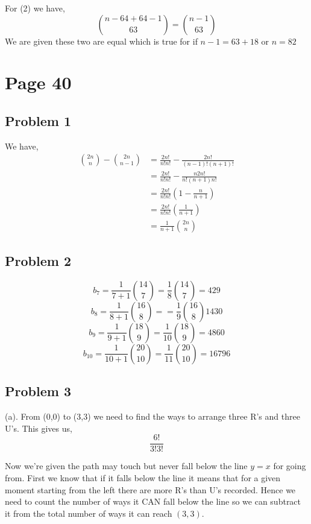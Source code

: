 \documentclass[a4paper]{report}
\begin{document}
For (2) we have, 
$$ {n - 64 + 64 - 1 \choose 63} = {n - 1 \choose 63} $$ 
We are given these two are equal which is true for if $n - 1 = 63 + 18$ or  $n = 82$


\section*{Page 40}
\subsection*{Problem 1}
We have, 
\begin{align*}
    {2n \choose n } - {2n \choose n - 1} &= \frac{2n!}{n!n!} - \frac{2n!}{(n-1)!(n + 1)!}\\
                                         &= \frac{2n!}{n!n!} - \frac{n 2n!}{n! (n+1) n!}\\
                                         &= \frac{2n!}{n!n!}(1 - \frac{n}{n + 1})\\
                                         &= \frac{2n!}{n!n!}(\frac{1}{n + 1}) \\
                                         &= \frac{1}{n + 1}{2n \choose n}
\end{align*}


\subsection*{Problem 2}

$$ b_7 = \frac{1}{7 + 1} {14 \choose 7} = \frac{1}{8} {14 \choose 7} = 429$$ 
$$ b_8 = \frac{1}{8 + 1} {16 \choose 8} = = \frac{1}{9} {16 \choose 8} 1430$$ 
$$ b_9 = \frac{1}{9 + 1} {18 \choose 9} = \frac{1}{10} {18 \choose 9} =4860 $$ 
$$ b_10 = \frac{1}{10 + 1} {20 \choose 10} = \frac{1}{11} {20 \choose 10} = 16796$$ 

\subsection*{Problem 3}
(a). From  (0,0) to (3,3) we need to find the ways to arrange three R's and three U's. This gives us, 
$$ \frac{6!}{3!3!} $$ 

Now we're given the path may touch but never fall below the line $y = x$ for going from. First we know that if it falls below the line it means that for a given moment starting from the left there are more R's than U's recorded. Hence we need to count the number of ways it CAN fall below the line so we can subtract it from the total number of ways it can reach $(3,3)$.
\end{document}
